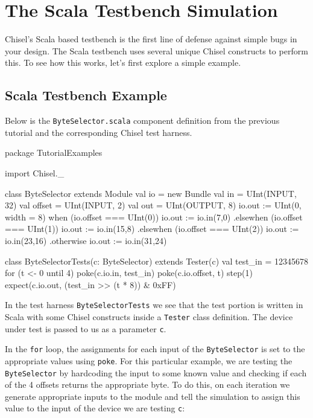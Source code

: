 \section{The Scala Testbench Simulation}

Chisel's Scala based testbench is the first line of defense against simple bugs in your design. The Scala testbench uses several unique Chisel constructs to perform this. To see how this works, let's first explore a simple example.

\subsection{Scala Testbench Example}

Below is the \verb+ByteSelector.scala+ component definition from the previous tutorial and the corresponding Chisel test harness.

\begin{scala}
package TutorialExamples

import Chisel._

class ByteSelector extends Module {
  val io = new Bundle {
    val in     = UInt(INPUT, 32)
    val offset = UInt(INPUT, 2)
    val out    = UInt(OUTPUT, 8)
  }
  io.out := UInt(0, width = 8)
  when (io.offset === UInt(0)) {
    io.out := io.in(7,0)
  } .elsewhen (io.offset === UInt(1)) {
    io.out := io.in(15,8)
  } .elsewhen (io.offset === UInt(2)) {
    io.out := io.in(23,16)
  } .otherwise {
    io.out := io.in(31,24)
  }    
}

class ByteSelectorTests(c: ByteSelector) extends Tester(c) {
  val test_in = 12345678
  for (t <- 0 until 4) {
    poke(c.io.in,     test_in)
    poke(c.io.offset, t)
    step(1)
    expect(c.io.out, (test_in >> (t * 8)) & 0xFF)
  }
}
\end{scala}

In the test harness \verb+ByteSelectorTests+ we see that the test portion is written in Scala with some Chisel constructs inside a \verb+Tester+ class definition. The device under test is passed to us as a parameter \verb+c+. 

In the \verb+for+ loop, the assignments for each input of the \verb+ByteSelector+ is set to the appropriate values using \verb+poke+. For this particular example, we are testing the \verb+ByteSelector+ by hardcoding the input to some known value and checking if each of the 4 offsets returns the appropriate byte. To do this, on each iteration we generate appropriate inputs to the module and tell the simulation to assign this value to the input of the device we are testing \verb+c+:

